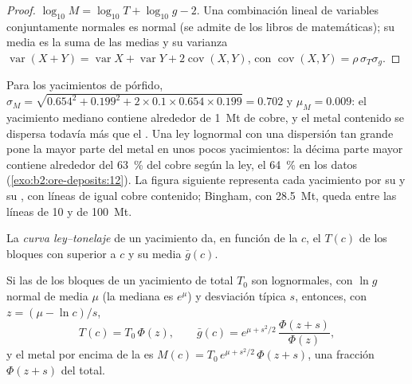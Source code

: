 \begin{proof}
$\log_{10} M = \log_{10} T + \log_{10} g - 2$. Una combinación lineal de variables conjuntamente normales es
normal (se admite de los libros de matemáticas); su media es la suma de las medias y su varianza
$\operatorname{var}(X + Y) = \operatorname{var} X + \operatorname{var} Y + 2\operatorname{cov}(X, Y)$,
con $\operatorname{cov}(X, Y) = \rho\,\sigma_T\sigma_g$.
\end{proof}

Para los yacimientos de pórfido, $\sigma_M = \sqrt{0.654^2 + 0.199^2 + 2 \times 0.1 \times 0.654 \times
0.199} = 0.702$ y $\mu_M = 0.009$: el yacimiento mediano contiene alrededor de \qty{1}{Mt} de cobre, y el
metal contenido se dispersa todavía más que el . Una ley lognormal con una dispersión tan grande
pone la mayor parte del metal en unos pocos yacimientos: la décima parte mayor contiene alrededor del \qty{63}{\percent} del
cobre según la ley, el \qty{64}{\percent} en los datos (\cref{exo:b2:ore-deposits:12}). La
figura siguiente representa cada yacimiento por su  y su , con líneas de igual cobre contenido;
Bingham, con \qty{28.5}{Mt}, queda entre las líneas de 10 y de \qty{100}{Mt}.

\begin{definition}\label{def:b2:ore-deposits:gt}
La \emph{curva ley--tonelaje} de un yacimiento da, en función de
la  $c$, el  $T(c)$ de los bloques con  superior a $c$ y su  media
$\bar g(c)$.
\end{definition}

\begin{proposition}\label{prop:b2:ore-deposits:gt}
Si las  de los bloques de un yacimiento de  total $T_0$ son lognormales, con $\ln g$ normal
de media $\mu$ (la  mediana es $e^{\mu}$) y desviación típica $s$, entonces, con $z = (\mu -
\ln c)/s$,
\begin{equation}
T(c) = T_0\,\Phi(z), \qquad
\bar g(c) = e^{\mu + s^2/2}\,\frac{\Phi(z + s)}{\Phi(z)} ,
\label{eq:b2:ore-deposits:gt}
\end{equation}
y el metal por encima de la  es $M(c) = T_0\,e^{\mu + s^2/2}\,\Phi(z + s)$, una fracción $\Phi(z +
s)$ del total.
\end{proposition}


